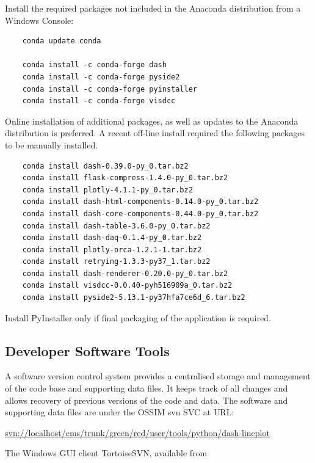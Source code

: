 Install the required packages not included in the Anaconda distribution from a Windows Console:
\footnotesize
\begin{lstlisting}
    conda update conda

    conda install -c conda-forge dash
    conda install -c conda-forge pyside2
    conda install -c conda-forge pyinstaller
    conda install -c conda-forge visdcc

\end{lstlisting}
\normalsize

Online installation of additional packages, as well as updates to the Anaconda distribution is preferred.
A recent off-line install required the following packages to be manually installed.

\footnotesize
\begin{lstlisting}
    conda install dash-0.39.0-py_0.tar.bz2
    conda install flask-compress-1.4.0-py_0.tar.bz2
    conda install plotly-4.1.1-py_0.tar.bz2
    conda install dash-html-components-0.14.0-py_0.tar.bz2
    conda install dash-core-components-0.44.0-py_0.tar.bz2
    conda install dash-table-3.6.0-py_0.tar.bz2
    conda install dash-daq-0.1.4-py_0.tar.bz2
    conda install plotly-orca-1.2.1-1.tar.bz2
    conda install retrying-1.3.3-py37_1.tar.bz2
    conda install dash-renderer-0.20.0-py_0.tar.bz2
    conda install visdcc-0.0.40-pyh516909a_0.tar.bz2
    conda install pyside2-5.13.1-py37hfa7ce6d_6.tar.bz2

\end{lstlisting}
\normalsize

Install PyInstaller only if final packaging of the application is required.

\subsection{Developer Software Tools}

\label{sec:devtools}

A software version control system provides a centralised storage and management of the code base and supporting data files.
It keeps track of all changes and allows recovery of previous versions of the code and data.
The software and supporting data files are under the \ac{OSSIM}  \ac{svn} \ac{SVC} at \ac{URL}:

\footnotesize
\url{svn://localhost/cms/trunk/green/red/user/tools/python/dash-lineplot}
\normalsize

The Windows \ac{GUI} client TortoiseSVN, available from

